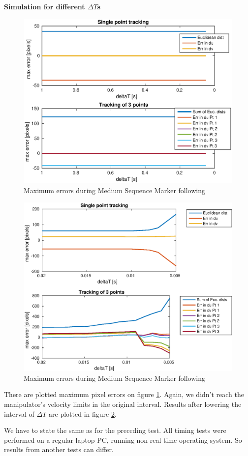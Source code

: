 \documentclass[]{scrartcl}
\begin{document}
\vspace{0.5cm}
\textbf{Simulation for different $\Delta T$s} \\
\begin{figure}
	\centering
	\includegraphics[width=0.7\linewidth]{fig/MediumSequence_errors.eps}
	\caption{Maximum errors during Medium Sequence Marker following}
	\label{fig:MediumSequence_errors}
\end{figure}
\begin{figure}
	\centering
	\includegraphics[width=0.7\linewidth]{fig/MediumSequence_low_dTs_errors.eps}
	\caption{Maximum errors during Medium Sequence Marker following}
	\label{fig:MediumSequence_low_dTs_errors}
\end{figure}
There are plotted maximum pixel errors on figure \ref{fig:MediumSequence_errors}. Again, we didn't reach the manipulator's velocity limits in the original interval. Results after lowering the interval of $\Delta T$ are plotted in figure \ref{fig:MediumSequence_low_dTs_errors}.

We have to state the same as for the preceding test. All timing tests were performed on a regular laptop PC, running non-real time operating system. So results from another tests can differ.
\end{document}
